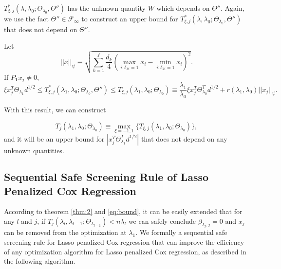 $T^*_{\xi,j}(\lambda,\lambda_0;\Theta_{\lambda_0},\Theta'')$ has the unknown quantity $W$ which depends on $\Theta''$. Again, we use the fact $\Theta''\in\mathcal{F}_\infty$ to construct an upper bound for $T^*_{\xi,j}(\lambda,\lambda_0;\Theta_{\lambda_0},\Theta'')$ that does not depend on $\Theta''$.

\begin{theorem}
    \label{thm:2}
    Let
    \begin{equation}
        \label{eq:prod}
        ||x||_\psi\equiv\sqrt{\sum_{k=1}^f\frac{d_k}{4}\left(\max_{i:\delta_{ki}=1}x_i-\min_{i:\delta_{ki}=1}x_i\right)^2}.
    \end{equation}
    If $P_{\mathbf{1}}x_j\neq 0$,
    \begin{equation}
        \label{eq:gbbar}
        \xi x_j^T\Theta_{\lambda_1}d^{1/2}\leq T^*_{\xi,j}(\lambda_1,\lambda_0;\Theta_{\lambda_0},\Theta'')\leq T_{\xi,j}(\lambda_1,\lambda_0;\Theta_{\lambda_0})\equiv\frac{\lambda_1}{\lambda_0}\xi x_j^T\Theta_{\lambda_0}^Td^{1/2}+r(\lambda_1,\lambda_0)||x_j||_\psi.
    \end{equation}
\end{theorem}

With this result, we can construct

\begin{equation}
    \label{eq:bound}
    T_j(\lambda_1,\lambda_0;\Theta_{\lambda_0})\equiv\max_{\xi=-1,1}\{T_{\xi,j}(\lambda_1,\lambda_0;\Theta_{\lambda_0})\},
\end{equation}
and it will be an upper bound for $|x_j^T\Theta^T_{\lambda_1}d^{1/2}|$ that does not depend on any unknown quantities. 

\subsection{Sequential Safe Screening Rule of Lasso Penalized Cox Regression}

According to theorem \ref{thm:2} and \eqref{eq:bound}, it can be easily extended that for any $l$ and $j$, if $T_j(\lambda_{l},\lambda_{l-1};\Theta_{\lambda_{l-1}})<n\lambda_l$ we can safely conclude $\beta_{\lambda_l,j}=0$ and $x_j$ can be removed from the optimization at $\lambda_1$. We formally a sequential safe screening rule for Lasso penalized Cox regression that can improve the efficiency of any optimization algorithm for Lasso penalized Cox regression, as described in the following algorithm. 

